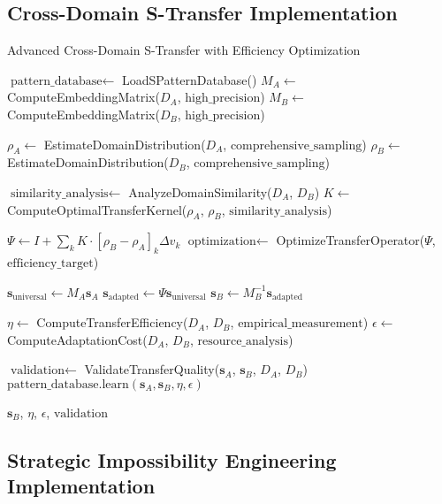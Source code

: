 \documentclass[11pt]{article}
\theoremstyle{definition}
\theoremstyle{remark}
\begin{document}
\subsection{Cross-Domain S-Transfer Implementation}

\begin{algorithm}[H]
\caption{Advanced Cross-Domain S-Transfer with Efficiency Optimization}
\label{alg:cross_domain_transfer_advanced}
\begin{algorithmic}[1]
    \State $\text{pattern\_database} \gets$ LoadSPatternDatabase()
    \State $M_A \gets$ ComputeEmbeddingMatrix($D_A$, $\text{high\_precision}$)
    \State $M_B \gets$ ComputeEmbeddingMatrix($D_B$, $\text{high\_precision}$)
    
    \State $\rho_A \gets$ EstimateDomainDistribution($D_A$, $\text{comprehensive\_sampling}$)
    \State $\rho_B \gets$ EstimateDomainDistribution($D_B$, $\text{comprehensive\_sampling}$)
    
    \State $\text{similarity\_analysis} \gets$ AnalyzeDomainSimilarity($D_A$, $D_B$)
    \State $K \gets$ ComputeOptimalTransferKernel($\rho_A$, $\rho_B$, $\text{similarity\_analysis}$)
    
    \State $\Psi \gets I + \sum_k K \cdot [\rho_B - \rho_A]_k \Delta v_k$
    \State $\text{optimization} \gets$ OptimizeTransferOperator($\Psi$, $\text{efficiency\_target}$)
    
    \State $\mathbf{s}_{\text{universal}} \gets M_A \mathbf{s}_A$
    \State $\mathbf{s}_{\text{adapted}} \gets \Psi \mathbf{s}_{\text{universal}}$
    \State $\mathbf{s}_B \gets M_B^{-1} \mathbf{s}_{\text{adapted}}$
    
    \State $\eta \gets$ ComputeTransferEfficiency($D_A$, $D_B$, $\text{empirical\_measurement}$)
    \State $\epsilon \gets$ ComputeAdaptationCost($D_A$, $D_B$, $\text{resource\_analysis}$)
    
    \State $\text{validation} \gets$ ValidateTransferQuality($\mathbf{s}_A$, $\mathbf{s}_B$, $D_A$, $D_B$)
    \State $\text{pattern\_database.learn}(\mathbf{s}_A, \mathbf{s}_B, \eta, \epsilon)$
    
    \State \Return $\mathbf{s}_B$, $\eta$, $\epsilon$, $\text{validation}$
\EndProcedure
\end{algorithmic}
\end{algorithm}

\subsection{Strategic Impossibility Engineering Implementation}
\end{document}
